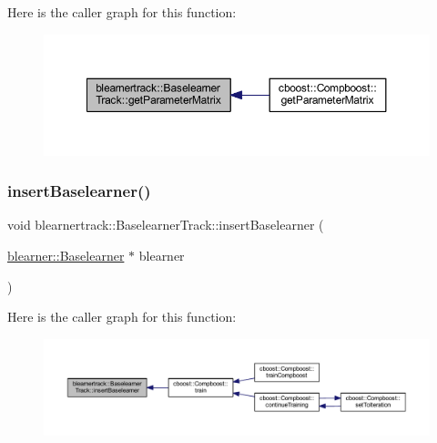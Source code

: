 Here is the caller graph for this function\+:\nopagebreak
\begin{figure}[H]
\begin{center}
\leavevmode
\includegraphics[width=350pt]{classblearnertrack_1_1_baselearner_track_a4b6d2d8b585148c71ed5b6055c9ab08c_icgraph}
\end{center}
\end{figure}
\mbox{\label{classblearnertrack_1_1_baselearner_track_abc5f42093449e665b5b0dfeee8570953}} 
\subsubsection{\texorpdfstring{insert\+Baselearner()}{insertBaselearner()}}
{\footnotesize\ttfamily void blearnertrack\+::\+Baselearner\+Track\+::insert\+Baselearner (\begin{DoxyParamCaption}\item[{\mbox{\hyperlink{classblearner_1_1_baselearner}{blearner\+::\+Baselearner}} $\ast$}]{blearner }\end{DoxyParamCaption})}

Here is the caller graph for this function\+:\nopagebreak
\begin{figure}[H]
\begin{center}
\leavevmode
\includegraphics[width=350pt]{classblearnertrack_1_1_baselearner_track_abc5f42093449e665b5b0dfeee8570953_icgraph}
\end{center}
\end{figure}
\mbox{\label{classblearnertrack_1_1_baselearner_track_a06f0ac986a158eecddce64e6c7af0750}} 

